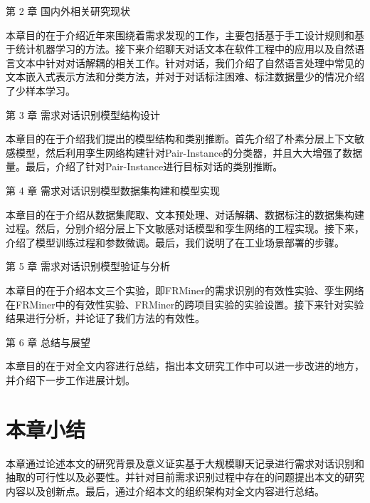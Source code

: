 第 2 章 国内外相关研究现状

本章目的在于介绍近年来围绕着需求发现的工作，主要包括基于手工设计规则和基于统计机器学习的方法。接下来介绍聊天对话文本在软件工程中的应用以及自然语言文本中针对对话解耦的相关工作。针对对话，我们介绍了自然语言处理中常见的文本嵌入式表示方法和分类方法，并对于对话标注困难、标注数据量少的情况介绍了少样本学习。

第 3 章 需求对话识别模型结构设计

本章目的在于介绍我们提出的{\tool}模型结构和类别推断。首先介绍了朴素分层上下文敏感模型，然后利用孪生网络构建针对Pair-Instance的分类器，并且大大增强了数据量。最后，介绍了针对Pair-Instance进行目标对话的类别推断。

第 4 章 需求对话识别模型数据集构建和模型实现

本章目的在于介绍从数据集爬取、文本预处理、对话解耦、数据标注的数据集构建过程。然后，分别介绍分层上下文敏感对话模型和孪生网络的工程实现。接下来，介绍了模型训练过程和参数微调。最后，我们说明了{\tool}在工业场景部署的步骤。

第 5 章 需求对话识别模型验证与分析

本章目的在于介绍本文三个实验，即FRMiner的需求识别的有效性实验、孪生网络在FRMiner中的有效性实验、FRMiner的跨项目实验的实验设置。接下来针对实验结果进行分析，并论证了我们方法的有效性。

第 6 章 总结与展望

本章目的在于对全文内容进行总结，指出本文研究工作中可以进一步改进的地方，并介绍下一步工作进展计划。 


\section{本章小结}

本章通过论述本文的研究背景及意义证实基于大规模聊天记录进行需求对话识别和抽取的可行性以及必要性。并针对目前需求识别过程中存在的问题提出本文的研究内容以及创新点。最后，通过介绍本文的组织架构对全文内容进行总结。 